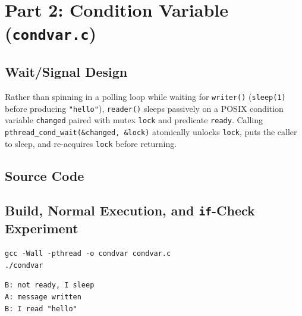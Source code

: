 \documentclass[12pt,a4paper]{article}
\begin{document}
\section{Part 2: Condition Variable (\texttt{condvar.c})}

\subsection{Wait/Signal Design}
Rather than spinning in a polling loop while waiting for \texttt{writer()} (\texttt{sleep(1)} before producing \texttt{"hello"}), \texttt{reader()} sleeps passively on a POSIX condition variable \texttt{changed} paired with mutex \texttt{lock} and predicate \texttt{ready}. Calling \texttt{pthread\_\allowbreak cond\_\allowbreak wait(\allowbreak\&changed, \&lock)} atomically unlocks \texttt{lock}, puts the caller to sleep, and re-acquires \texttt{lock} before returning.

\newpage
\subsection{Source Code}


\newpage
\subsection{Build, Normal Execution, and \texttt{if}-Check Experiment}
\begin{lstlisting}[style=bashstyle]
gcc -Wall -pthread -o condvar condvar.c
./condvar
\end{lstlisting}

\begin{lstlisting}[style=consolestyle, caption={Observed output of \texttt{./condvar} (and identical output with \texttt{if (!ready)}; exit code \texttt{0})}]
B: not ready, I sleep
A: message written
B: I read "hello"
\end{lstlisting}
\end{document}
